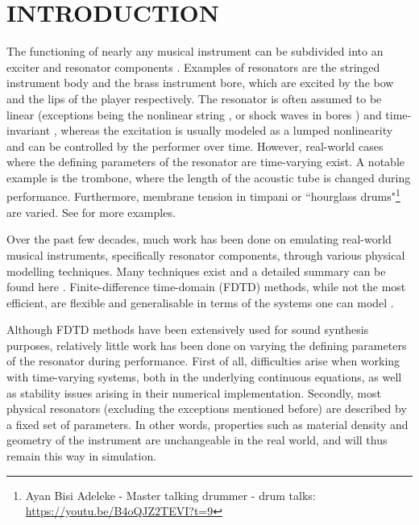 \documentclass[fleqn]{jaes}
\begin{document}
\section{INTRODUCTION}\label{sec:introduction}

The functioning of nearly any musical instrument can be subdivided into an exciter and resonator components \cite{mcintyre1983oscillations, Borin1989}. Examples of resonators are the stringed instrument body and the brass instrument bore, which are excited by the bow and the lips of the player respectively. The resonator is often assumed to be linear (exceptions being the nonlinear string \cite{Carrier1945}, or shock waves in bores \cite{Hirschberg1996, Msallam2000, Vergez2000}) and time-invariant , whereas the excitation is usually modeled as a lumped nonlinearity and can be controlled by the performer over time. However, real-world cases where the defining parameters of the resonator are time-varying exist.
A notable example is the trombone, where the length of the acoustic tube is changed during performance. Furthermore, membrane tension in timpani or ``hourglass drums"\footnote{Ayan Bisi Adeleke - Master talking drummer - drum talks: \url{https://youtu.be/B4oQJZ2TEVI?t=9}} are varied. %
See \cite[Sec. 12.4]{Willemsen2021Thesis} for more examples. 

Over the past few decades, much work has been done on emulating real-world musical instruments, specifically resonator components, through various physical modelling techniques. Many techniques exist and a detailed summary can be found here \cite{valimaki2005discrete}. Finite-difference time-domain (FDTD) methods, while not the most efficient, are flexible and generalisable in terms of the systems one can model \cite{Bilbao2009}.

Although FDTD methods have been extensively used for sound synthesis purposes, relatively little work has been done on varying the defining parameters of the resonator during performance. First of all, difficulties arise when working with time-varying systems, both in the underlying continuous equations, as well as stability issues arising in their numerical implementation. Secondly, most physical resonators (excluding the exceptions mentioned before) are described by a fixed set of parameters. In other words, properties such as material density and geometry of the instrument are unchangeable in the real world, and will thus remain this way in simulation.
\end{document}
